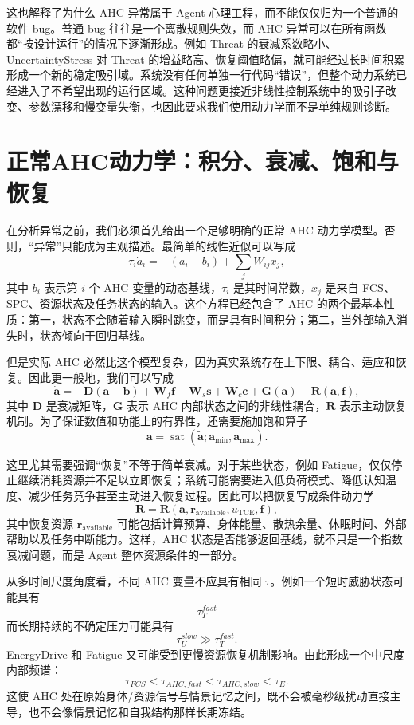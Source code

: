 这也解释了为什么 AHC 异常属于 Agent 心理工程，而不能仅仅归为一个普通的软件 bug。普通 bug 往往是一个离散规则失效，而 AHC 异常可以在所有函数都“按设计运行”的情况下逐渐形成。例如 Threat 的衰减系数略小、UncertaintyStress 对 Threat 的增益略高、恢复阈值略偏，就可能经过长时间积累形成一个新的稳定吸引域。系统没有任何单独一行代码“错误”，但整个动力系统已经进入了不希望出现的运行区域。这种问题更接近非线性控制系统中的吸引子改变、参数漂移和慢变量失衡，也因此要求我们使用动力学而不是单纯规则诊断。

\section{正常AHC动力学：积分、衰减、饱和与恢复}
\label{sec:ahc_normal_dynamics}

在分析异常之前，我们必须首先给出一个足够明确的正常 AHC 动力学模型。否则，“异常”只能成为主观描述。最简单的线性近似可以写成
\[
\tau_i\dot a_i
=
-\left(a_i-b_i\right)
+
\sum_j W_{ij}x_j,
\]
其中 $b_i$ 表示第 $i$ 个 AHC 变量的动态基线，$\tau_i$ 是其时间常数，$x_j$ 是来自 FCS、SPC、资源状态及任务状态的输入。这个方程已经包含了 AHC 的两个最基本性质：第一，状态不会随着输入瞬时跳变，而是具有时间积分；第二，当外部输入消失时，状态倾向于回归基线。

但是实际 AHC 必然比这个模型复杂，因为真实系统存在上下限、耦合、适应和恢复。因此更一般地，我们可以写成
\[
\dot{\mathbf a}
=
-\mathbf D
\left(
\mathbf a-\mathbf b
\right)
+
\mathbf W_f\mathbf f
+
\mathbf W_s\mathbf s
+
\mathbf W_c\mathbf c
+
\mathbf G(\mathbf a)
-
\mathbf R(\mathbf a,\mathbf f),
\]
其中 $\mathbf D$ 是衰减矩阵，$\mathbf G$ 表示 AHC 内部状态之间的非线性耦合，$\mathbf R$ 表示主动恢复机制。为了保证数值和功能上的有界性，还需要施加饱和算子
\[
\mathbf a
=
\operatorname{sat}
\left(
\tilde{\mathbf a};
\mathbf a_{\min},
\mathbf a_{\max}
\right).
\]

这里尤其需要强调“恢复”不等于简单衰减。对于某些状态，例如 Fatigue，仅仅停止继续消耗资源并不足以立即恢复；系统可能需要进入低负荷模式、降低认知温度、减少任务竞争甚至主动进入恢复过程。因此可以把恢复写成条件动力学
\[
\mathbf R
=
\mathbf R
\left(
\mathbf a,
\mathbf r_{\mathrm{available}},
u_{\mathrm{TCE}},
\mathbf f
\right),
\]
其中恢复资源 $\mathbf r_{\mathrm{available}}$ 可能包括计算预算、身体能量、散热余量、休眠时间、外部帮助以及任务中断能力。这样，AHC 状态是否能够返回基线，就不只是一个指数衰减问题，而是 Agent 整体资源条件的一部分。

从多时间尺度角度看，不同 AHC 变量不应具有相同 $\tau$。例如一个短时威胁状态可能具有
\[
\tau_T^{fast}
\]
而长期持续的不确定压力可能具有
\[
\tau_U^{slow}
\gg
\tau_T^{fast}.
\]
EnergyDrive 和 Fatigue 又可能受到更慢资源恢复机制影响。由此形成一个中尺度内部频谱：
\[
\tau_{FCS}
<
\tau_{AHC,fast}
<
\tau_{AHC,slow}
<
\tau_E.
\]
这使 AHC 处在原始身体/资源信号与情景记忆之间，既不会被毫秒级扰动直接主导，也不会像情景记忆和自我结构那样长期冻结。

